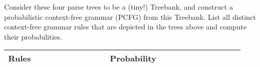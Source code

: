 \documentclass[11pt]{article}
\begin{document}
\begin{enumerate}
\begin{figure}[h]
\begin{minipage}[b]{0.5\linewidth}
\end{minipage}
\begin{minipage}[b]{0.5\linewidth}
\centering
{}
\end{minipage}
\end{figure}

\begin{figure}[h]	
\begin{minipage}[b]{0.5\linewidth}
\centering
{}
\end{minipage}
\begin{minipage}[b]{0.5\linewidth}
\centering
{}
\end{minipage}
\end{figure}

Consider these four parse trees to be a (tiny!) Treebank, and construct a
probabilistic context-free grammar (PCFG) from this Treebank. 
List all distinct context-free grammar rules that are depicted in the
trees above and compute their probabilities.

\begin{center}
	\begin{tabular}{l@{\hskip 1in}c} 
	 \textbf{Rules~~~~~~~~~~~~~~~} & \textbf{Probability~~~~~~~~~~~~~~~~~} \\ \hline 
 \end{tabular}
\end{center}




\end{enumerate}
\end{document}
